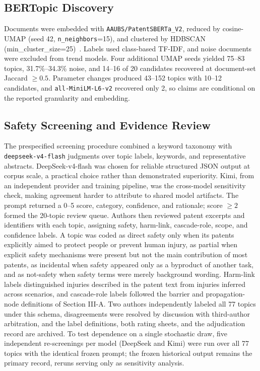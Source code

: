 \documentclass[letterpaper,9pt,conference]{ieeeconf}
\begin{document}
\subsection{BERTopic Discovery}

Documents were embedded with \texttt{AAUBS/PatentSBERTa\_V2}, reduced by cosine-UMAP (seed 42, \texttt{n\_neighbors}=15), and clustered by HDBSCAN (min\_cluster\_size=25)~\cite{grootendorst2022,bekamiri2021,mcinnes2017,mcinnes2018}. Labels used class-based TF-IDF, and noise documents were excluded from trend models. Four additional UMAP seeds yielded 75--83 topics, 31.7\%--34.3\% noise, and 14--16 of 20 candidates recovered at document-set Jaccard $\geq 0.5$. Parameter changes produced 43--152 topics with 10--12 candidates, and \texttt{all-MiniLM-L6-v2} recovered only 2, so claims are conditional on the reported granularity and embedding.

\subsection{Safety Screening and Evidence Review}

The prespecified screening procedure combined a keyword taxonomy with \texttt{deepseek-v4-flash} judgments over topic labels, keywords, and representative abstracts. DeepSeek-v4-flash was chosen for reliable structured JSON output at corpus scale, a practical choice rather than demonstrated superiority. Kimi, from an independent provider and training pipeline, was the cross-model sensitivity check, making agreement harder to attribute to shared model artifacts. The prompt returned a 0--5 score, category, confidence, and rationale; score $\geq 2$ formed the 20-topic review queue. Authors then reviewed patent excerpts and identifiers with each topic, assigning safety, harm-link, cascade-role, scope, and confidence labels. A topic was coded as direct safety only when its patents explicitly aimed to protect people or prevent human injury, as partial when explicit safety mechanisms were present but not the main contribution of most patents, as incidental when safety appeared only as a byproduct of another task, and as not-safety when safety terms were merely background wording. Harm-link labels distinguished injuries described in the patent text from injuries inferred across scenarios, and cascade-role labels followed the barrier and propagation-node definitions of Section III-A. Two authors independently labeled all 77 topics under this schema, disagreements were resolved by discussion with third-author arbitration, and the label definitions, both rating sheets, and the adjudication record are archived. To test dependence on a single stochastic draw, five independent re-screenings per model (DeepSeek and Kimi) were run over all 77 topics with the identical frozen prompt; the frozen historical output remains the primary record, reruns serving only as sensitivity analysis.
\end{document}
